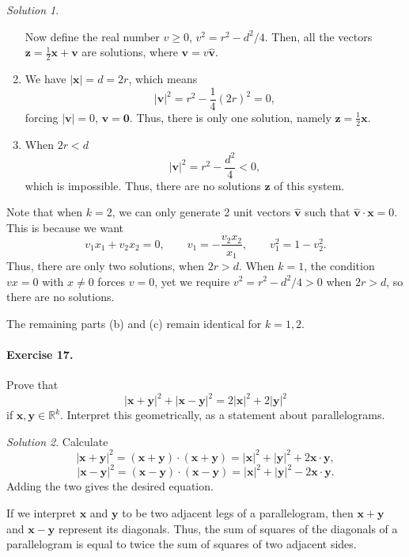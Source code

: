 \documentclass[11pt]{report}
\def\R{\mathbb{R}}
\renewcommand\vec\boldsymbol
\def\vx{\vec{x}}
\def\vy{\vec{y}}
\def\vz{\vec{z}}
\theoremstyle{remark}
\newtheorem*{solution}{Solution}
\begin{document}
\begin{solution}
\begin{enumerate}
            Now define the real number $v \geq 0$, $v^2 = r^2 - d^2 / 4$. Then,
            all the vectors $\vz = \frac{1}{2}\vx + \vec{v}$ are
            solutions, where $\vec{v} = v\hat{\vec{v}}$.

            \item We have $|\vx| = d = 2r$, which means \[
                |\vec{v}|^2 = r^2 - \frac{1}{4}(2r)^2 = 0,
            \] forcing $|\vec{v}| = 0$, $\vec{v} = \vec{0}$. Thus, there is only one
            solution, namely $\vz = \frac{1}{2}\vx$.

            \item When $2r < d$ \[
                |\vec{v}|^2 = r^2 - \frac{d^2}{4} < 0,
            \] which is impossible. Thus, there are no solutions $\vz$ of this
            system.
        \end{enumerate}
        Note that when $k = 2$, we can only generate 2 unit vectors $\hat{\vec{v}}$
        such that $\hat{\vec{v}}\cdot\vx = 0$. This is because we want \[
            v_1x_1 + v_2x_2 = 0, \qquad v_1 = -\frac{v_2x_2}{x_1}, \qquad v_1^2 = 1
            - v_2^2.
        \] Thus, there are only two solutions, when $2r > d$. When $k = 1$, the
        condition $vx = 0$ with $x \neq 0$ forces $v = 0$, yet we require
        $v^2 = r^2 - d^2 / 4 > 0$ when $2r > d$, so there are no solutions.

        The remaining parts (b) and (c) remain identical for $k = 1, 2$.
    \end{solution}
    
    \paragraph{Exercise 17.} Prove that \[
        |\vx + \vy|^2 + |\vx - \vy|^2 = 2|\vx|^2 + 2|\vy|^2
    \] if $\vx, \vy \in \R^k$. Interpret this geometrically, as a statement about
    parallelograms.
    \begin{solution}
        Calculate \[
            |\vx + \vy|^2 = (\vx + \vy)\cdot(\vx + \vy) = |\vx|^2 + |\vy|^2 +
            2\vx\cdot\vy,
        \] \[
            |\vx - \vy|^2 = (\vx - \vy)\cdot(\vx - \vy) = |\vx|^2 + |\vy|^2 -
            2\vx\cdot\vy.
        \] Adding the two gives the desired equation.

        If we interpret $\vx$ and $\vy$ to be two adjacent legs of a parallelogram,
        then $\vx + \vy$ and $\vx - \vy$ represent its diagonals. Thus, the sum of
        squares of the diagonals of a parallelogram is equal to twice the sum of
        squares of two adjacent sides.
    \end{solution}
\end{document}
